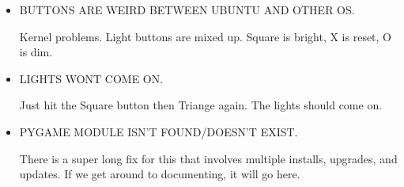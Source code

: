 \documentclass[
18pt, %
a4paper, %
oneside, %
headinclude,footinclude, %
]{scrartcl}
\begin{document}
\begin{itemize}
	\item BUTTONS ARE WEIRD BETWEEN UBUNTU AND OTHER OS. 
	
	Kernel problems. Light buttons are mixed up. Square is bright, X is reset, O is dim.
\end{itemize}

\begin{itemize}
	\item LIGHTS WONT COME ON. 
	
	Just hit the Square button then Triange again. The lights should come on.
\end{itemize}

\begin{itemize}
	\item PYGAME MODULE ISN'T FOUND/DOESN'T EXIST. 
	
	There is a super long fix for this that involves multiple installs, upgrades, and updates. If we get around to documenting, it will go here.
\end{itemize}
\end{document}
